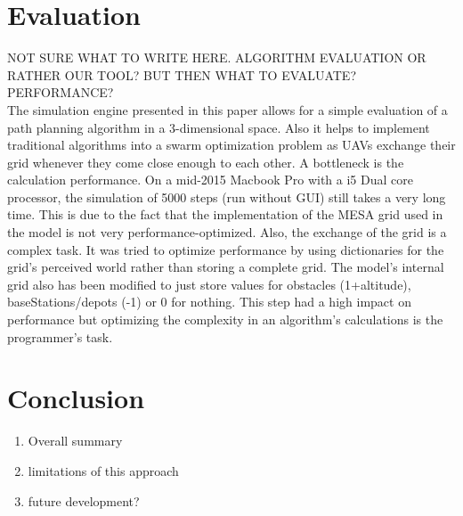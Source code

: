 \section{Evaluation}
NOT SURE WHAT TO WRITE HERE. ALGORITHM EVALUATION OR RATHER OUR TOOL? BUT THEN WHAT TO EVALUATE? PERFORMANCE? \\
The simulation engine presented in this paper allows for a simple evaluation of a path planning algorithm in a 3-dimensional space. Also it helps to implement traditional algorithms into a swarm optimization problem as UAVs exchange their grid whenever they come close enough to each other. A bottleneck is the calculation performance. On a mid-2015 Macbook Pro with a i5 Dual core processor, the simulation of 5000 steps (run without GUI) still takes a very long time. This is due to the fact that the implementation of the MESA grid used in the model is not very performance-optimized. Also, the exchange of the grid is a complex task. It was tried to optimize performance by using dictionaries for the grid's perceived world rather than storing a complete grid. The model's internal grid also has been modified to just store values for obstacles (1+altitude), baseStations/depots (-1) or 0 for nothing. This step had a high impact on performance but optimizing the complexity in an algorithm's calculations is the programmer's task.

\section{Conclusion}
\begin{enumerate}
	\item Overall summary
	\item limitations of this approach
	\item future development?
\end{enumerate}

